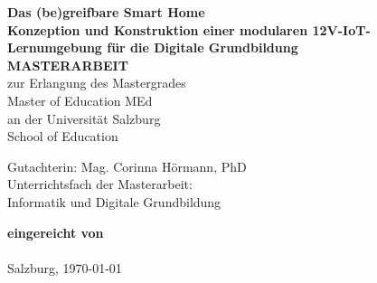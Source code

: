 \begin{titlepage}
    \begin{center}
        \textbf{\Huge Das (be)greifbare Smart Home\\}
        \textbf{\large Konzeption und Konstruktion einer modularen 12V-IoT-Lernumgebung für die Digitale Grundbildung\\}
        \vspace{3cm}
        \textbf{\LARGE MASTERARBEIT\\}
        \vspace{0.5cm}
        {\large zur Erlangung des Mastergrades\\Master of Education MEd\\}
        \vspace{1cm}
        {\large an der Universität Salzburg\\School of Education}
        \vspace{1cm}
        
        {\large Gutachterin: Mag. Corinna Hörmann, PhD\\}
        {\large Unterrichtsfach der Masterarbeit:\\ Informatik und Digitale Grundbildung}


        \vspace{3cm}
        \textbf{eingereicht von\\ \textsc{\LARGE \@author } \\}
        \vfill
        {\Large Salzburg, \monthyeardate\today}
    \end{center}
\end{titlepage}
\pagestyle{empty}   %